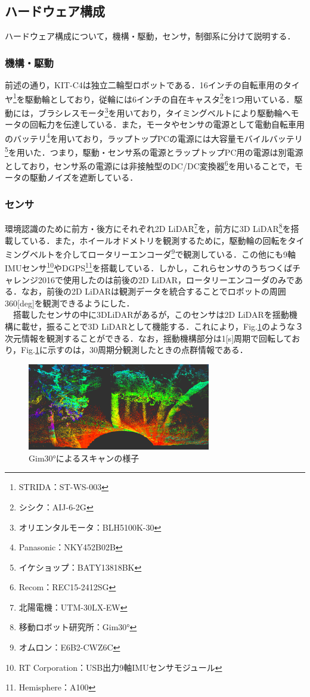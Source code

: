 \documentclass[10pt,a4paper]{jarticle}
\begin{document}
\subsection{ハードウェア構成}
ハードウェア構成について，機構・駆動，センサ，制御系に分けて説明する．
\subsubsection{機構・駆動}
前述の通り，KIT-C4は独立二輪型ロボットである．16インチの自転車用のタイヤ\footnote{STRIDA：ST-WS-003}を駆動輪としており，従輪には6インチの自在キャスタ\footnote{シシク：AIJ-6-2G}を1つ用いている．駆動には，ブラシレスモータ\footnote{オリエンタルモータ：BLH5100K-30}を用いており，タイミングベルトにより駆動輪へモータの回転力を伝達している．また，モータやセンサの電源として電動自転車用のバッテリ\footnote{Panasonic：NKY452B02B}を用いており，ラップトップPCの電源には大容量モバイルバッテリ\footnote{イケショップ：BATY13818BK}を用いた．つまり，駆動・センサ系の電源とラップトップPC用の電源は別電源としており，センサ系の電源には非接触型のDC/DC変換器\footnote{Recom：REC15-2412SG}を用いることで，モータの駆動ノイズを遮断している．
\subsubsection{センサ}
環境認識のために前方・後方にそれぞれ2D LiDAR\footnote{北陽電機：UTM-30LX-EW}を，前方に3D LiDAR\footnote{移動ロボット研究所：Gim30°}を搭載している．また，ホイールオドメトリを観測するために，駆動輪の回転をタイミングベルトを介してロータリーエンコーダ\footnote{オムロン：E6B2-CWZ6C}で観測している．この他にも9軸IMUセンサ\footnote{RT Corporation：USB出力9軸IMUセンサモジュール}やDGPS\footnote{Hemisphere：A100}を搭載している．しかし，これらセンサのうちつくばチャレンジ2016で使用したのは前後の2D LiDAR，ロータリーエンコーダのみである．なお，前後の2D LiDARは観測データを統合することでロボットの周囲360[deg]を観測できるようにした．\\
　搭載したセンサの中に3DLiDARがあるが，このセンサは2D LiDARを揺動機構に載せ，振ることで3D LiDARとして機能する\cite{gim30}．これにより，Fig.\ref{fig:gim30}のような３次元情報を観測することができる．なお，揺動機構部分は1[s]周期で回転しており，Fig.\ref{fig:gim30}に示すのは，30周期分観測したときの点群情報である．

\begin{figure}[tbp]
\centering
 \includegraphics[width=8cm]{fig/scan.eps}
 \caption{Gim30°によるスキャンの様子}
 \label{fig:gim30}
\end{figure}
\end{document}
